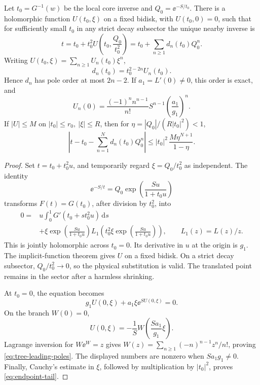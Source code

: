 \begin{theorem}
\label{thm:finite-endpoint}
Let \(t_0=G^{-1}(w)\) be the local core inverse and
\(Q_0=\ee^{-S/t_0}\).
There is a holomorphic function \(U(t_0,\xi)\) on a fixed bidisk,
with \(U(t_0,0)=0\), such that for sufficiently small \(t_0\) in
any strict decay subsector the unique nearby inverse is
\begin{equation}\label{eq:endpoint-exact}
 t=t_0+t_0^2U\left(t_0,\frac{Q_0}{t_0^2}\right)
   =t_0+\sum_{n\ge1}d_n(t_0)Q_0^n.
\end{equation}
Writing \(U(t_0,\xi)=\sum_{n\ge1}U_n(t_0)\xi^n\),
\[
 d_n(t_0)=t_0^{2-2n}U_n(t_0).
\]
Hence \(d_n\) has pole order at most \(2n-2\).
If \(a_1=L'(0)\ne0\), this order is exact, and
\begin{equation}\label{eq:tree-leading-poles}
 U_n(0)=\frac{(-1)^n n^{n-1}}{n!}
 S^{n-1}\left(\frac{a_1}{g_1}\right)^n .
\end{equation}
If \(|U|\le M\) on \(|t_0|\le r_0,\ |\xi|\le R\), then
for \(\eta=|Q_0|/(R|t_0|^2)<1\),
\begin{equation}\label{eq:endpoint-tail}
 \left|t-t_0-\sum_{n=1}^Nd_n(t_0)Q_0^n\right|
 \le |t_0|^2\,\frac{M\eta^{N+1}}{1-\eta}.
\end{equation}
\end{theorem}
\begin{proof}
Set \(t=t_0+t_0^2u\), and temporarily regard
\(\xi=Q_0/t_0^2\) as independent.  The identity
\[
 \ee^{-S/t}=
 Q_0\exp\left(\frac{Su}{1+t_0u}\right)
\]
transforms \(F(t)=G(t_0)\), after division by \(t_0^2\), into
\begin{align*}
 0={}&
 u\int_0^1G'(t_0+s t_0^2u)\,\mathrm ds\\
 &+\xi\exp\left(\frac{Su}{1+t_0u}\right)
 L_1\left(t_0^2\xi
       \exp\left(\frac{Su}{1+t_0u}\right)\right),
 \qquad L_1(z)=L(z)/z.
\end{align*}
This is jointly holomorphic across \(t_0=0\).
Its derivative in \(u\) at the origin is \(g_1\).
The implicit-function theorem gives \(U\) on a fixed bidisk.
On a strict decay subsector,
\(Q_0/t_0^2\to0\), so the physical substitution is valid.
The translated point remains in the sector after a harmless shrinking.

At \(t_0=0\), the equation becomes
\[
 g_1U(0,\xi)+a_1\xi\ee^{S U(0,\xi)}=0.
\]
On the branch \(W(0)=0\),
\begin{equation}\label{eq:endpoint-lambert}
 U(0,\xi)=-\frac1S
 W\left(\frac{Sa_1}{g_1}\xi\right).
\end{equation}
Lagrange inversion for \(W\ee^W=z\) gives
\(W(z)=\sum_{n\ge1}(-n)^{n-1}z^n/n!\), proving
\cref{eq:tree-leading-poles}.
The displayed numbers are nonzero when \(Sa_1g_1\ne0\).
Finally, Cauchy's estimate in \(\xi\), followed by multiplication
by \(|t_0|^2\), proves \cref{eq:endpoint-tail}.
\end{proof}

